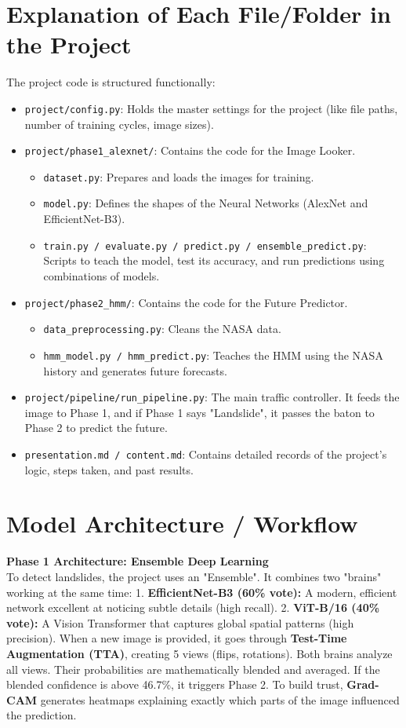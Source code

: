 \documentclass[12pt,a4paper]{article}
\begin{document}
\section{Explanation of Each File/Folder in the Project}
The project code is structured functionally:
\begin{itemize}
    \item \texttt{project/config.py}: Holds the master settings for the project (like file paths, number of training cycles, image sizes).
    \item \texttt{project/phase1\_alexnet/}: Contains the code for the Image Looker.
    \begin{itemize}
        \item \texttt{dataset.py}: Prepares and loads the images for training.
        \item \texttt{model.py}: Defines the shapes of the Neural Networks (AlexNet and EfficientNet-B3).
        \item \texttt{train.py / evaluate.py / predict.py / ensemble\_predict.py}: Scripts to teach the model, test its accuracy, and run predictions using combinations of models.
    \end{itemize}
    \item \texttt{project/phase2\_hmm/}: Contains the code for the Future Predictor.
    \begin{itemize}
        \item \texttt{data\_preprocessing.py}: Cleans the NASA data.
        \item \texttt{hmm\_model.py / hmm\_predict.py}: Teaches the HMM using the NASA history and generates future forecasts.
    \end{itemize}
    \item \texttt{project/pipeline/run\_pipeline.py}: The main traffic controller. It feeds the image to Phase 1, and if Phase 1 says "Landslide", it passes the baton to Phase 2 to predict the future.
    \item \texttt{presentation.md / content.md}: Contains detailed records of the project's logic, steps taken, and past results.
\end{itemize}

\section{Model Architecture / Workflow}
\textbf{Phase 1 Architecture: Ensemble Deep Learning}\\
To detect landslides, the project uses an "Ensemble". It combines two "brains" working at the same time:
1. \textbf{EfficientNet-B3 (60\% vote):} A modern, efficient network excellent at noticing subtle details (high recall).
2. \textbf{ViT-B/16 (40\% vote):} A Vision Transformer that captures global spatial patterns (high precision).
When a new image is provided, it goes through \textbf{Test-Time Augmentation (TTA)}, creating 5 views (flips, rotations). Both brains analyze all views. Their probabilities are mathematically blended and averaged. If the blended confidence is above 46.7\%, it triggers Phase 2. To build trust, \textbf{Grad-CAM} generates heatmaps explaining exactly which parts of the image influenced the prediction.
\end{document}
